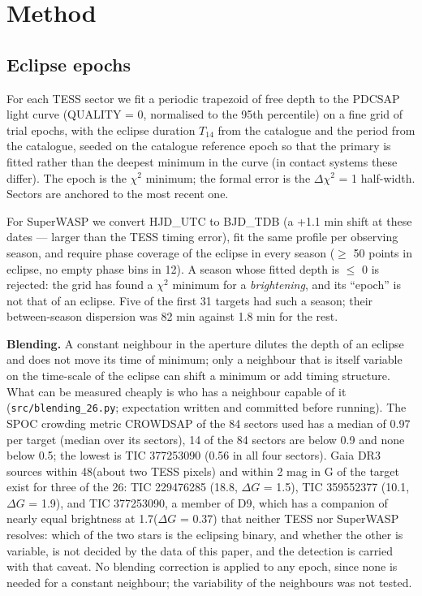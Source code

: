 \documentclass{aa}
\begin{document}
\section{Method}\label{s:met}

\subsection{Eclipse epochs}\label{ss:epocas}
For each TESS sector we fit a periodic trapezoid of free depth to the PDCSAP light curve (QUALITY = 0, normalised to the 95th percentile) on a fine grid of trial epochs, with the eclipse duration $T_{14}$ from the catalogue and the period from the catalogue, seeded on the catalogue reference epoch so that the primary is fitted rather than the deepest minimum in the curve (in contact systems these differ). The epoch is the $\chi^2$ minimum; the formal error is the $\Delta\chi^2$ = 1 half-width. Sectors are anchored to the most recent one.

For SuperWASP we convert HJD\_UTC to BJD\_TDB (a +1.1 min shift at these dates --- larger than the TESS timing error), fit the same profile per observing season, and require phase coverage of the eclipse in every season ($\ge$ 50 points in eclipse, no empty phase bins in 12). A season whose fitted depth is $\le$ 0 is rejected: the grid has found a $\chi^2$ minimum for a \textit{brightening}, and its ``epoch'' is not that of an eclipse. Five of the first 31 targets had such a season; their between-season dispersion was 82 min against 1.8 min for the rest.

\textbf{Blending.} A constant neighbour in the aperture dilutes the depth of an eclipse and does not move its time of minimum; only a neighbour that is itself variable on the time-scale of the eclipse can shift a minimum or add timing structure. What can be measured cheaply is who has a neighbour capable of it (\texttt{src/\allowbreak blending\_\allowbreak 26.py}; expectation written and committed before running). The SPOC crowding metric CROWDSAP of the 84 sectors used has a median of 0.97 per target (median over its sectors), 14 of the 84 sectors are below 0.9 and none below 0.5; the lowest is TIC 377253090 (0.56 in all four sectors). Gaia DR3 sources within 48\arcsec (about two TESS pixels) and within 2 mag in G of the target exist for three of the 26: TIC 229476285 (18.8\arcsec, $\Delta G$ = 1.5), TIC 359552377 (10.1\arcsec, $\Delta G$ = 1.9), and TIC 377253090, a member of D9, which has a companion of nearly equal brightness at 1.7\arcsec ($\Delta G$ = 0.37) that neither TESS nor SuperWASP resolves: which of the two stars is the eclipsing binary, and whether the other is variable, is not decided by the data of this paper, and the detection is carried with that caveat. No blending correction is applied to any epoch, since none is needed for a constant neighbour; the variability of the neighbours was not tested.
\end{document}
